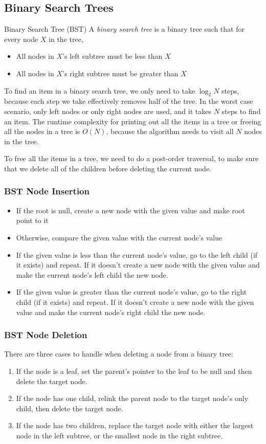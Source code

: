 \documentclass[class=article, crop=false]{standalone}
\begin{document}
  \subsection{Binary Search Trees}
  \begin{definition}{Binary Search Tree (BST)}
    A \emph{binary search tree} is a binary tree such that for every node $X$ in the tree,
    \begin{itemize}
      \item All nodes in $X$'s left subtree must be less than $X$
      \item All nodes in $X$'s right subtree must be greater than $X$
    \end{itemize}
  \end{definition}
  To find an item in a binary search tree, we only need to take $\log_2N$ steps, because each step we take effectively removes half of the tree. In the worst case scenario, only left nodes or only right nodes are used, and it takes $N$ steps to find an item. The runtime complexity for printing out all the items in a tree or freeing all the nodes in a tree is $O(N)$, because the algorithm needs to visit all $N$ nodes in the tree. \par
  To free all the items in a tree, we need to do a post-order traversal, to make sure that we delete all of the children before deleting the current node.
  \subsubsection{BST Node Insertion}
  \begin{itemize}
    \item If the root is null, create a new node with the given value and make root point to it
    \item Otherwise, compare the given value with the current node's value
    \item If the given value is less than the current node's value, go to the left child (if it exists) and repeat. If it doesn't create a new node with the given value and make the current node's left child the new node.
    \item If the given value is greater than the current node's value, go to the right child (if it exists) and repeat. If it doesn't create a new node with the given value and make the current node's right child the new node.
  \end{itemize}
  \subsubsection{BST Node Deletion}
  There are three cases to handle when deleting a node from a binary tree:
  \begin{enumerate}
    \item If the node is a leaf, set the parent's pointer to the leaf to be null and then delete the target node.
    \item If the node has one child, relink the parent node to the target node's only child, then delete the target node.
    \item If the node has two children, replace the target node with either the largest node in the left subtree, or the smallest node in the right subtree.
  \end{enumerate}
\end{document}
